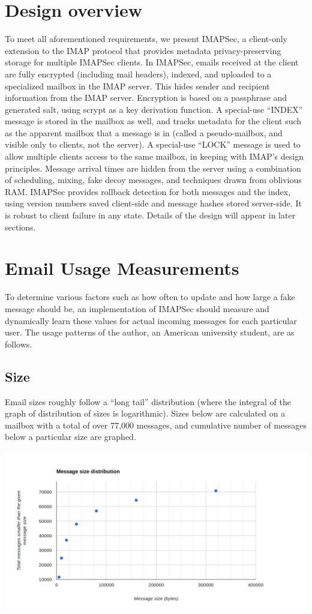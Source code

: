 \documentclass[pageno]{jpaper}
\newcommand{\project}{IMAPSec }
\newcommand{\projectnospace}{IMAPSec}
\begin{document}
\section{Design overview}
To meet all aforementioned requirements, we present \projectnospace, a client-only extension to the IMAP protocol that provides metadata privacy-preserving storage for multiple \project clients. In \projectnospace, emails received at the client are fully encrypted (including mail headers), indexed, and uploaded to a specialized mailbox in the IMAP server. This hides sender and recipient information from the IMAP server. Encryption is based on a passphrase and generated salt, using scrypt as a key derivation function. A special-use ``INDEX'' message is stored in the mailbox as well, and tracks metadata for the client such as the apparent mailbox that a message is in (called a pseudo-mailbox, and visible only to clients, not the server). A special-use ``LOCK'' message is used to allow multiple clients access to the same mailbox, in keeping with IMAP's design principles. Message arrival times are hidden from the server using a combination of scheduling, mixing, fake decoy messages, and techniques drawn from oblivious RAM. \project provides rollback detection for both messages and the index, using version numbers saved client-side and message hashes stored server-side. It is robust to client failure in any state. Details of the design will appear in later sections.

\section{Email Usage Measurements}
To determine various factors such as how often to update and how large a fake message should be, an implementation of \project should measure and dynamically learn these values for actual incoming messages for each particular user. The usage patterns of the author, an American university student, are as follows.

\subsection{Size}

Email sizes roughly follow a ``long tail'' distribution (where the integral of the graph of distribution of sizes is logarithmic). Sizes below are calculated on a mailbox with a total of over 77,000 messages, and cumulative number of messages below a particular size are graphed.

\includegraphics[width=\textwidth]{message-size-dist}
\end{document}
